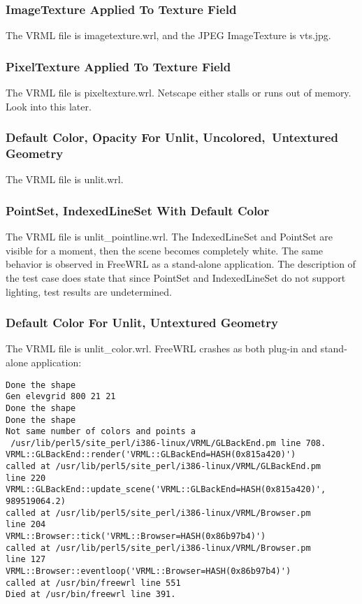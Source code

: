 \documentclass[12pt,letterpaper]{article}
\newcommand{\AppB}{ImageTexture Applied To Texture Field}
\newcommand{\AppC}{PixelTexture Applied To Texture Field}
\newcommand{\AppDa}{Default Color, Opacity For Unlit, Uncolored,~}
\newcommand{\AppDb}{Untextured Geometry}
\newcommand{\AppE}{PointSet, IndexedLineSet With Default Color}
\newcommand{\AppF}{Default Color For Unlit, Untextured Geometry}
\begin{document}
\subsubsection{\AppB}
\label{sec:imagetexture}
The VRML file is imagetexture.wrl, and the JPEG ImageTexture is vts.jpg.

\subsubsection{\AppC}
The VRML file is pixeltexture.wrl.\newline
Netscape either stalls or runs out of memory.
Look into this later.

\subsubsection{\AppDa\AppDb}
\label{sec:unlit}
The VRML file is unlit.wrl.

\subsubsection{\AppE}
The VRML file is unlit\_pointline.wrl.\newline
The IndexedLineSet and PointSet are visible for a moment, then the scene becomes completely white. 
The same behavior is observed in FreeWRL as a stand-alone application.\newline
The description of the test case does state that since PointSet and IndexedLineSet do not support
lighting, test results are undetermined.

\subsubsection{\AppF}
The VRML file is unlit\_color.wrl.\newline
FreeWRL crashes as both plug-in and stand-alone application:
\begin{verbatim}
Done the shape
Gen elevgrid 800 21 21
Done the shape
Done the shape
Not same number of colors and points a
 /usr/lib/perl5/site_perl/i386-linux/VRML/GLBackEnd.pm line 708.
VRML::GLBackEnd::render('VRML::GLBackEnd=HASH(0x815a420)')
called at /usr/lib/perl5/site_perl/i386-linux/VRML/GLBackEnd.pm
line 220
VRML::GLBackEnd::update_scene('VRML::GLBackEnd=HASH(0x815a420)',
989519064.2)
called at /usr/lib/perl5/site_perl/i386-linux/VRML/Browser.pm
line 204
VRML::Browser::tick('VRML::Browser=HASH(0x86b97b4)')
called at /usr/lib/perl5/site_perl/i386-linux/VRML/Browser.pm
line 127
VRML::Browser::eventloop('VRML::Browser=HASH(0x86b97b4)')
called at /usr/bin/freewrl line 551
Died at /usr/bin/freewrl line 391.
\end{verbatim}
\end{document}
